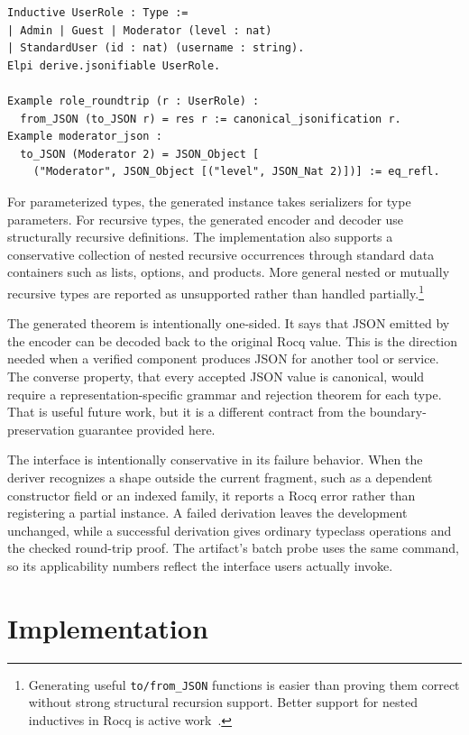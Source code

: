\documentclass[runningheads]{llncs}
\begin{document}
\begin{lstlisting}[language=Coq]
Inductive UserRole : Type :=
| Admin | Guest | Moderator (level : nat)
| StandardUser (id : nat) (username : string).
Elpi derive.jsonifiable UserRole.

Example role_roundtrip (r : UserRole) :
  from_JSON (to_JSON r) = res r := canonical_jsonification r.
Example moderator_json :
  to_JSON (Moderator 2) = JSON_Object [
    ("Moderator", JSON_Object [("level", JSON_Nat 2)])] := eq_refl.
\end{lstlisting}

For parameterized types, the generated instance takes serializers for type
parameters.  For recursive types, the generated encoder and decoder use
structurally recursive definitions.  The implementation also supports a
conservative collection of nested recursive occurrences through standard data
containers such as lists, options, and products.  More general nested or
mutually recursive types are reported as unsupported rather than handled
partially.\footnote{Generating useful \texttt{to/from\_JSON} functions is easier
  than proving them correct without strong structural recursion support.  Better
  support for nested inductives in Rocq is active work~\cite{Lamiaux:2026:Rocq-Nested-Inductives}.}

The generated theorem is intentionally one-sided.  It says that JSON emitted by
the encoder can be decoded back to the original Rocq value.  This is the
direction needed when a verified component produces JSON for another tool or
service.  The converse property, that every accepted JSON value is canonical,
would require a representation-specific grammar and rejection theorem for each
type.  That is useful future work, but it is a different contract from the
boundary-preservation guarantee provided here.

The interface is intentionally conservative in its failure behavior.  When the
deriver recognizes a shape outside the current fragment, such as a dependent
constructor field or an indexed family, it reports a Rocq error rather than
registering a partial instance.  A failed derivation leaves the development
unchanged, while a successful derivation gives ordinary typeclass operations and
the checked round-trip proof.  The artifact's batch probe uses the same command,
so its applicability numbers reflect the interface users actually invoke.

\section{Implementation}
\end{document}
